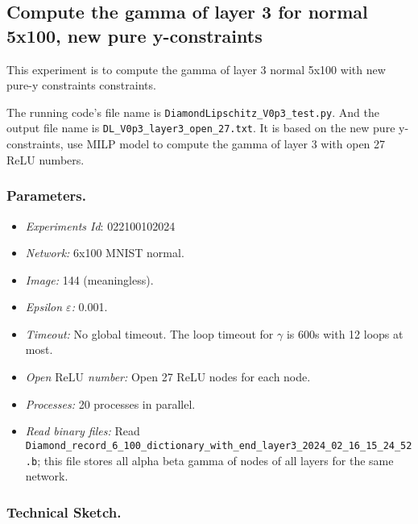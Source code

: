 \documentclass{llncs}
\newcommand{\ReLU}{\mathrm{ReLU}}
\begin{document}
\subsection{Compute the gamma of layer 3 for normal 5x100, new pure y-constraints}

This experiment is to  compute the gamma of layer 3 normal 5x100 with new pure-y constraints constraints.

\vspace*{1ex}

The running code's file name is \verb*|DiamondLipschitz_V0p3_test.py|. And the output file name is \verb*|DL_V0p3_layer3_open_27.txt|.  It is based on the new pure y-constraints, use MILP model to compute the gamma of layer 3 with open 27 ReLU numbers.

\subsubsection*{Parameters.}

\begin{itemize}
	\item\emph{Experiments Id}: 022100102024
	
	\item\emph{Network:} 6x100 MNIST normal. 
	
	\item\emph{Image:} 144 (meaningless).
	
	\item\emph{Epsilon $\varepsilon$:} 0.001.
	
	\item\emph{Timeout:} No global timeout. The loop timeout for $\gamma$ is 600s with 12 loops at most.
	
	\item\emph{Open $\ReLU$ number:} Open 27 ReLU nodes for each node.
	
	\item\emph{Processes:} 20 processes in parallel. 
	
	\item\emph{Read binary files:} Read \verb*|Diamond_record_6_100_dictionary_with_end_layer3_2024_02_16_15_24_52.b|; this file stores all alpha beta gamma of nodes of all layers for the same network. 
\end{itemize}


\subsubsection*{Technical Sketch.}
\end{document}
